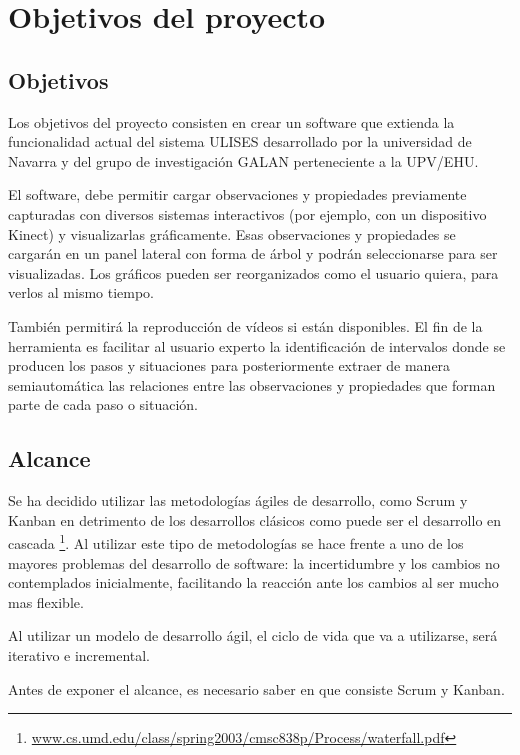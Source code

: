 \chapter{Objetivos del proyecto}


\section{Objetivos}
Los objetivos del proyecto consisten en crear un software que extienda la funcionalidad actual del sistema ULISES desarrollado 
por la universidad de Navarra y del grupo de investigación GALAN perteneciente a la UPV/EHU.

El software, debe permitir cargar observaciones y propiedades previamente capturadas con diversos
sistemas interactivos (por ejemplo, con un dispositivo Kinect) y
visualizarlas gr\'aficamente. Esas observaciones y propiedades se cargar\'an en un panel lateral con forma de \'arbol
y podr\'an seleccionarse para ser visualizadas. Los gr\'aficos pueden ser reorganizados como el
usuario quiera, para verlos al mismo tiempo.
 
Tambi\'en permitir\'a la reproducci\'on de v\'ideos si est\'an disponibles.
El fin de la herramienta es
facilitar al usuario experto la identificaci\'on de intervalos donde se producen los
pasos y situaciones para posteriormente extraer de manera semiautom\'atica las relaciones entre las observaciones y
propiedades que forman parte de cada paso o situaci\'on.

\section{Alcance}
Se ha decidido utilizar las metodolog\'ias
\'agiles de desarrollo, como Scrum y Kanban en detrimento de los desarrollos cl\'asicos 
como puede ser el desarrollo en cascada  
\footnote{\url{www.cs.umd.edu/class/spring2003/cmsc838p/Process/waterfall.pdf}}.
Al utilizar este tipo de metodolog\'ias se hace frente a uno de los mayores problemas del 
desarrollo de software: la incertidumbre y los cambios
no contemplados inicialmente, facilitando la reacci\'on ante los cambios
al ser mucho mas flexible.

Al utilizar un modelo de desarrollo \'agil, el ciclo de vida que va a utilizarse, ser\'a iterativo e incremental.

Antes de exponer el alcance, es necesario saber en que consiste Scrum y Kanban.

